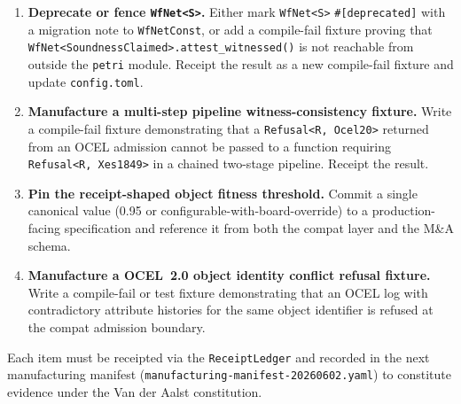 \begin{enumerate}
  \item \textbf{Deprecate or fence \texttt{WfNet<S>}.} Either mark \texttt{WfNet<S>}
    \texttt{\#[deprecated]} with a migration note to \texttt{WfNetConst}, or add a
    compile-fail fixture proving that \texttt{WfNet<SoundnessClaimed>.attest\_witnessed()}
    is not reachable from outside the \texttt{petri} module. Receipt the result as a new
    compile-fail fixture and update \texttt{config.toml}.
  \item \textbf{Manufacture a multi-step pipeline witness-consistency fixture.} Write a
    compile-fail fixture demonstrating that a \texttt{Refusal<R, Ocel20>} returned from
    an OCEL admission cannot be passed to a function requiring \texttt{Refusal<R, Xes1849>}
    in a chained two-stage pipeline. Receipt the result.
  \item \textbf{Pin the receipt-shaped object fitness threshold.} Commit a single canonical
    value (0.95 or configurable-with-board-override) to a production-facing specification
    and reference it from both the compat layer and the M\&A schema.
  \item \textbf{Manufacture a OCEL~2.0 object identity conflict refusal fixture.} Write a
    compile-fail or test fixture demonstrating that an OCEL log with contradictory attribute
    histories for the same object identifier is refused at the compat admission boundary.
\end{enumerate}

Each item must be receipted via the \texttt{ReceiptLedger} and recorded in the next
manufacturing manifest (\texttt{manufacturing-manifest-20260602.yaml}) to constitute
evidence under the Van der Aalst constitution.
